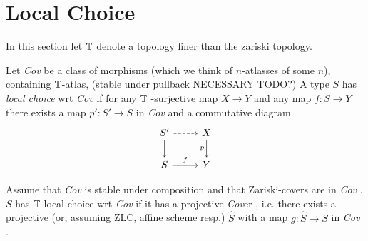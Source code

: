 \documentclass{article}
\newcommand{\Cov}{\emph{Cov} }
\newcommand{\Cover}{\emph{Cov}er }
\begin{document}
\section{Local Choice}
In this section let $\mathbb{T}$ denote a topology finer than the zariski topology.
\begin{definition}
    Let \Cov be a class of morphisms (which we think of $n$-atlasses of some $n$), containing $\mathbb{T}$-atlas, (stable under pullback NECESSARY TODO?)
    A type $S$ has \emph{local choice} wrt \Cov if for any $\mathbb{T}$ -surjective map $X \to Y$ and any map $f : S \to Y$ there exists a map  $p' : S' \to S$ in \Cov and a commutative diagram
\[\begin{tikzcd}
	{S'} & X \\
	S & Y
	\arrow[dashed, from=1-1, to=1-2]
	\arrow[from=1-1, to=2-1]
	\arrow["p"', from=1-2, to=2-2]
	\arrow["f",from=2-1, to=2-2]
\end{tikzcd}\]
\end{definition}
\begin{prop}{\label{prop:LocalChoice}}
    Assume that \Cov is stable under composition and that Zariski-covers are in \Cov.
    $S$ has  $\mathbb{T}$-local choice wrt \Cov if it has a projective \Cover, i.e. there exists a projective (or, assuming ZLC, affine scheme resp.)  $\hat{S}$ with a map $g : \hat{S} \to S$ in \Cov. %
\end{prop}
\end{document}
